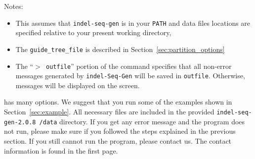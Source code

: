 \documentclass[10pt]{article}
\newcommand{\version}{2.0.8 }
\newcommand{\iSGcurrent}{indel-seq-gen-\version }
\begin{document}
 \noindent Notes:
 \begin{itemize}
 \item This assumes that {\tt indel-seq-gen} is in your {\tt PATH} and data files locations are specified relative to your present working directory,
 \item The {\tt guide\_tree\_file} is described in Section~\ref{sec:partition_options}
 \item The ``{\tt $>$ outfile}'' portion of the command  specifies that all non-error messages generated by {\tt indel-Seq-Gen} will be saved in {\tt outfile}. Otherwise, messages will be displayed on the screen.

 \end{itemize}

  has many options. We suggest that you run some of the examples shown in Section~\ref{sec:example}. All necessary files are included in the provided {\tt \iSGcurrent/data} directory.  If you get any error message and the program does not run, please make sure if you followed the steps explained in the previous section. If you still cannot run the program, please contact us. The contact information is found in the first page.
\end{document}
